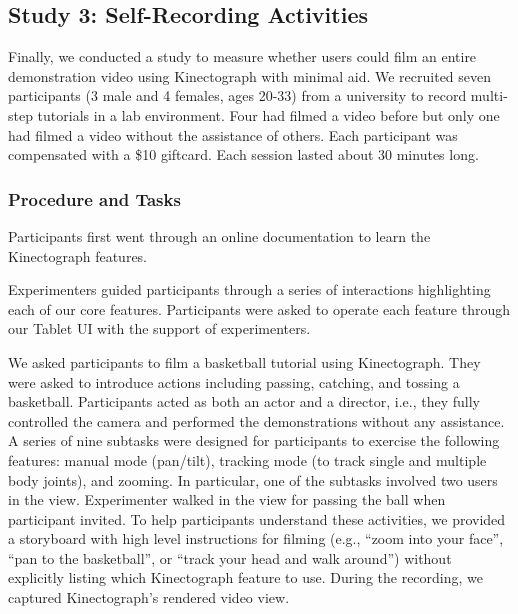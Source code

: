\subsection{Study 3: Self-Recording Activities}

Finally, we conducted a study to measure whether users could film an entire demonstration video using Kinectograph with minimal aid.
%
We recruited seven participants (3 male and 4 females, ages 20-33) from a university to record multi-step tutorials in a lab environment. Four had filmed a video before but only one had filmed a video without the assistance of others. Each participant was compensated with a \$10 giftcard. Each session lasted about 30 minutes long.

\subsubsection{Procedure and Tasks}
 Participants first went through an online documentation to learn the Kinectograph features. %

 Experimenters guided participants through a series of interactions highlighting each of our core features. Participants were asked to operate each feature through our Tablet UI with the support of experimenters.

 We asked participants to film a basketball tutorial using Kinectograph. They were asked to introduce actions including passing, catching, and tossing a basketball. Participants acted as both an actor and a director, i.e., they fully controlled the camera and performed the demonstrations without any assistance. A series of nine subtasks were designed for participants to exercise the following features: manual mode (pan/tilt), tracking mode (to track single and multiple body joints), and zooming. In particular, one of the subtasks involved two users in the view. Experimenter walked in the view for passing the ball when participant invited. To help participants understand these activities, we provided a storyboard with high level instructions for filming (e.g., ``zoom into your face'', ``pan to the basketball'', or ``track your head and walk around'') without explicitly listing which Kinectograph feature to use. During the recording, we captured Kinectograph's rendered video view.

